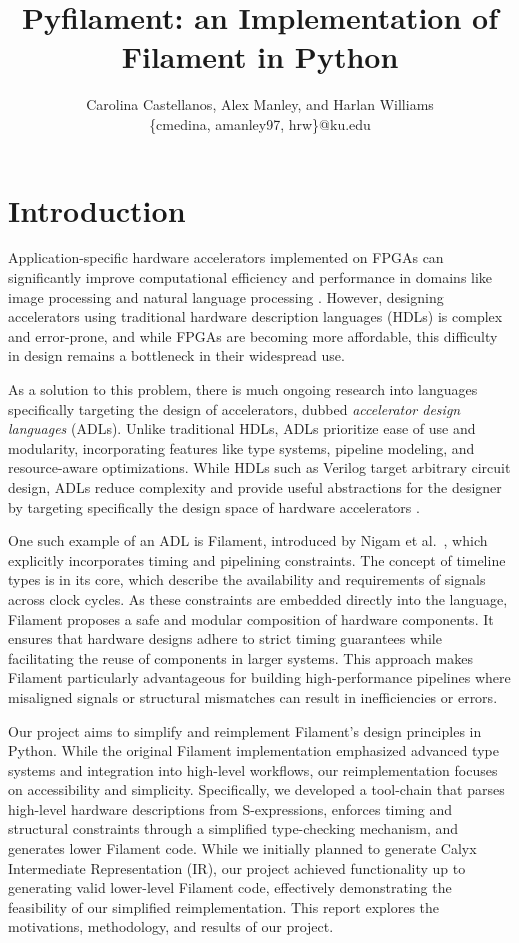 \documentclass[12pt,a4paper]{article}
\title{Pyfilament: an Implementation of Filament in Python}
\author{Carolina Castellanos, Alex Manley, and Harlan Williams\\\{cmedina, amanley97, hrw\}@ku.edu}
\date{}
\begin{document}
\maketitle

\section{Introduction}

Application-specific hardware accelerators implemented on FPGAs can significantly improve computational efficiency and performance in domains like image processing \cite{hegarty2014darkroom} and natural language processing \cite{khan21}. However, designing accelerators using traditional hardware description languages (HDLs) is complex and error-prone, and while FPGAs are becoming more affordable, this difficulty in design remains a bottleneck in their widespread use.

As a solution to this problem, there is much ongoing research into languages specifically targeting the design of accelerators, dubbed \emph{accelerator design languages} (ADLs). Unlike traditional HDLs, ADLs prioritize ease of use and modularity, incorporating features like type systems, pipeline modeling, and resource-aware optimizations. While HDLs such as Verilog target arbitrary circuit design, ADLs reduce complexity and provide useful abstractions for the designer by targeting specifically the design space of hardware accelerators \cite{sampson2021adl}.

One such example of an ADL is Filament, introduced by Nigam et al.~\cite{nigam2023filament}, which explicitly incorporates timing and pipelining constraints. The concept of timeline types is in its core, which describe the availability and requirements of signals across clock cycles. As these constraints are embedded directly into the language, Filament proposes a safe and modular composition of hardware components. It ensures that hardware designs adhere to strict timing guarantees while facilitating the reuse of components in larger systems. This approach makes Filament particularly advantageous for building high-performance pipelines where misaligned signals or structural mismatches can result in inefficiencies or errors.

Our project aims to simplify and reimplement Filament’s design principles in Python. While the original Filament implementation emphasized advanced type systems and integration into high-level workflows, our reimplementation focuses on accessibility and simplicity. Specifically, we developed a tool-chain that parses high-level hardware descriptions from S-expressions, enforces timing and structural constraints through a simplified type-checking mechanism, and generates lower Filament code. While we initially planned to generate Calyx \cite{nigam2021calyx} Intermediate Representation (IR), our project achieved functionality up to generating valid lower-level Filament code, effectively demonstrating the feasibility of our simplified reimplementation. This report explores the motivations, methodology, and results of our project. 
\end{document}
